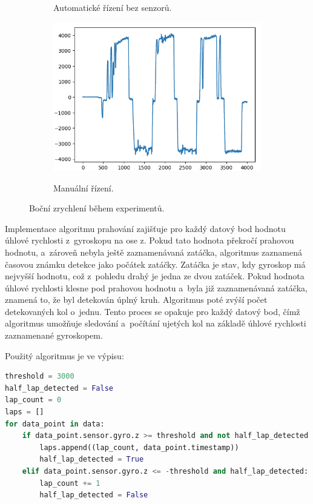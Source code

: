 \begin{figure}[!h]
\begin{subfigure}{.5\textwidth}
        \label{fig:LapsAuto}
        \caption{Automatické řízení bez senzorů.}
    \end{subfigure}
    \begin{subfigure}{.5\textwidth}
        \includegraphics[width = \textwidth]{Figures/LapManual.png}
        \label{fig:LapsManual}
        \caption{Manuální řízení.}
    \end{subfigure}
    \captionsetup{justification=centering}
    \caption{Boční zrychlení během experimentů.}
    \label{fig:Laps}
\end{figure}

Implementace algoritmu prahování zajišťuje pro každý datový bod hodnotu úhlové
rychlosti z~gyroskopu na ose z. Pokud tato hodnota překročí prahovou hodnotu,
a~zároveň nebyla ještě zaznamenávaná zatáčka, algoritmus zaznamená časovou známku 
detekce jako počátek zatáčky. Zatáčka je stav, kdy gyroskop má nejvyšší hodnotu, 
což z~pohledu drahý je jedna ze dvou zatáček. Pokud hodnota úhlové rychlosti klesne 
pod prahovou hodnotu a~byla již zaznamenávaná zatáčka, znamená to, že byl detekován 
úplný kruh. Algoritmus poté zvýší počet detekovaných kol o~jednu. Tento proces se 
opakuje pro každý datový bod, čímž algoritmus umožňuje sledování a~počítání ujetých 
kol na základě úhlové rychlosti zaznamenané gyroskopem. 

Použitý algoritmus je ve výpisu:

\begin{lstlisting}[language = python, caption = Počet kol., label = lst:countLap]
threshold = 3000
half_lap_detected = False
lap_count = 0
laps = []
for data_point in data:
    if data_point.sensor.gyro.z >= threshold and not half_lap_detected:
        laps.append((lap_count, data_point.timestamp))
        half_lap_detected = True
    elif data_point.sensor.gyro.z <= -threshold and half_lap_detected:
        lap_count += 1
        half_lap_detected = False
\end{lstlisting}

